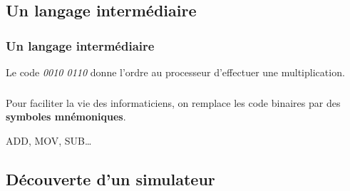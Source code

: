 \documentclass[svgnames,11pt]{beamer}
\begin{document}
\subsection{Un langage intermédiaire}
\begin{frame}
    \frametitle{Un langage intermédiaire}

    Le code \emph{0010 0110} donne l'ordre au processeur d'effectuer une multiplication.

\end{frame}
\begin{frame}
    \frametitle{}

    \begin{aretenir}[]
        Pour faciliter la vie des informaticiens, on remplace les code binaires par des \textbf{symboles mnémoniques}.

        \centering ADD, MOV, SUB\dots
    \end{aretenir}

\end{frame}
\subsection{Découverte d'un simulateur}
\end{document}
